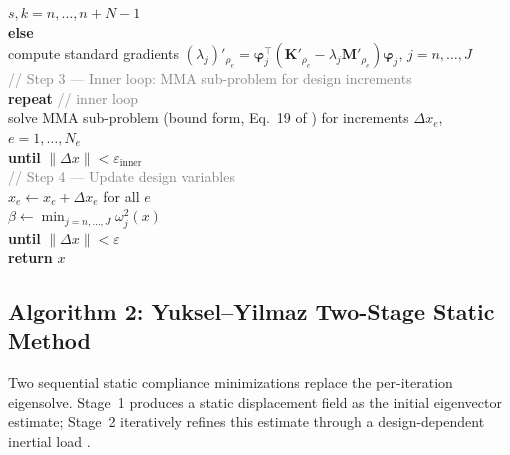 \documentclass[12pt,a4paper]{article}
\newcommand{\kw}[1]{\textbf{#1}}          %
\newcommand{\var}[1]{\textit{#1}}         %
\newcommand{\cm}[1]{\textcolor{gray}{#1}} %
\newcommand{\ind}{\hspace*{1.4em}}        %
\newcommand{\indd}{\hspace*{2.8em}}       %
\newcommand{\assign}{\ensuremath{\leftarrow}}%
\begin{document}
\begin{algobox}
      $s,k=n,\ldots,n{+}N{-}1$\\
\ind\kw{else}\\
\indd compute standard gradients
      $(\lambda_j)'_{\rho_e}=
      \boldsymbol{\varphi}_j^{\top}
      (\mathbf{K}'_{\rho_e}-\lambda_j\mathbf{M}'_{\rho_e})
      \boldsymbol{\varphi}_j$,\;
      $j=n,\ldots,J$\\[3pt]
%
\ind\cm{// Step 3 — Inner loop: MMA sub-problem for design increments}\\
\ind\kw{repeat} \cm{// inner loop}\\
\indd solve MMA sub-problem (bound form, Eq.~19 of \cite{Olhoff2014})
      for increments $\Delta x_e$,\; $e=1,\ldots,N_e$\\
\ind\kw{until} $\|\Delta\var{x}\| < \varepsilon_{\mathrm{inner}}$\\[3pt]
%
\ind\cm{// Step 4 — Update design variables}\\
\ind $x_e \assign x_e + \Delta x_e$ \quad for all $e$\\
\ind $\beta \assign \min_{j=n,\ldots,J}\omega_j^2(\var{x})$\\[4pt]
%
\kw{until} $\|\Delta\var{x}\| < \varepsilon$\\[4pt]
\kw{return} $x$
\end{algobox}

\subsection{Algorithm 2: Yuksel--Yilmaz Two-Stage Static Method}
\label{subsec:alg-yuksel}

Two sequential static compliance minimizations replace the per-iteration
eigensolve.
Stage~1 produces a static displacement field as the initial eigenvector
estimate; Stage~2 iteratively refines this estimate through a
design-dependent inertial load \cite{Yuksel2025}.
\end{document}
